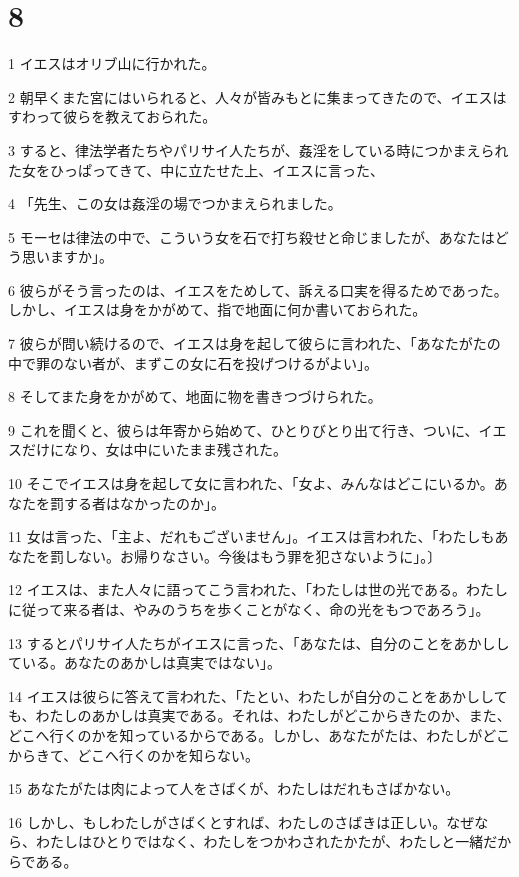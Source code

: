 \chapter{8}

\par 1 イエスはオリブ山に行かれた。
\par 2 朝早くまた宮にはいられると、人々が皆みもとに集まってきたので、イエスはすわって彼らを教えておられた。
\par 3 すると、律法学者たちやパリサイ人たちが、姦淫をしている時につかまえられた女をひっぱってきて、中に立たせた上、イエスに言った、
\par 4 「先生、この女は姦淫の場でつかまえられました。
\par 5 モーセは律法の中で、こういう女を石で打ち殺せと命じましたが、あなたはどう思いますか」。
\par 6 彼らがそう言ったのは、イエスをためして、訴える口実を得るためであった。しかし、イエスは身をかがめて、指で地面に何か書いておられた。
\par 7 彼らが問い続けるので、イエスは身を起して彼らに言われた、「あなたがたの中で罪のない者が、まずこの女に石を投げつけるがよい」。
\par 8 そしてまた身をかがめて、地面に物を書きつづけられた。
\par 9 これを聞くと、彼らは年寄から始めて、ひとりびとり出て行き、ついに、イエスだけになり、女は中にいたまま残された。
\par 10 そこでイエスは身を起して女に言われた、「女よ、みんなはどこにいるか。あなたを罰する者はなかったのか」。
\par 11 女は言った、「主よ、だれもございません」。イエスは言われた、「わたしもあなたを罰しない。お帰りなさい。今後はもう罪を犯さないように」。〕
\par 12 イエスは、また人々に語ってこう言われた、「わたしは世の光である。わたしに従って来る者は、やみのうちを歩くことがなく、命の光をもつであろう」。
\par 13 するとパリサイ人たちがイエスに言った、「あなたは、自分のことをあかししている。あなたのあかしは真実ではない」。
\par 14 イエスは彼らに答えて言われた、「たとい、わたしが自分のことをあかししても、わたしのあかしは真実である。それは、わたしがどこからきたのか、また、どこへ行くのかを知っているからである。しかし、あなたがたは、わたしがどこからきて、どこへ行くのかを知らない。
\par 15 あなたがたは肉によって人をさばくが、わたしはだれもさばかない。
\par 16 しかし、もしわたしがさばくとすれば、わたしのさばきは正しい。なぜなら、わたしはひとりではなく、わたしをつかわされたかたが、わたしと一緒だからである。
